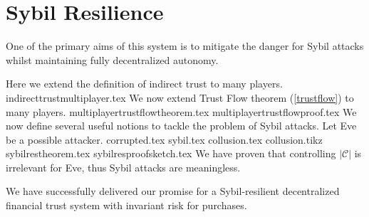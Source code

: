 \section{Sybil Resilience}
  One of the primary aims of this system is to mitigate the danger for Sybil attacks \cite{sybilattack} whilst maintaining
  fully decentralized autonomy.

  Here we extend the definition of indirect trust to many players.
  {indirecttrustmultiplayer.tex}
  We now extend Trust Flow theorem (\ref{trustflow}) to many players.
  {multiplayertrustflowtheorem.tex}
  {multiplayertrustflowproof.tex}
  We now define several useful notions to tackle the problem of Sybil attacks. Let Eve be a possible attacker.
  {corrupted.tex}
  {sybil.tex}
  {collusion.tex}
  {collusion.tikz}
  {sybilrestheorem.tex}
  {sybilresproofsketch.tex}
  We have proven that controlling $|\mathcal{C}|$ is irrelevant for Eve, thus Sybil attacks are meaningless.

  We have successfully delivered our promise for a Sybil-resilient decentralized financial trust system with
  invariant risk for purchases.

